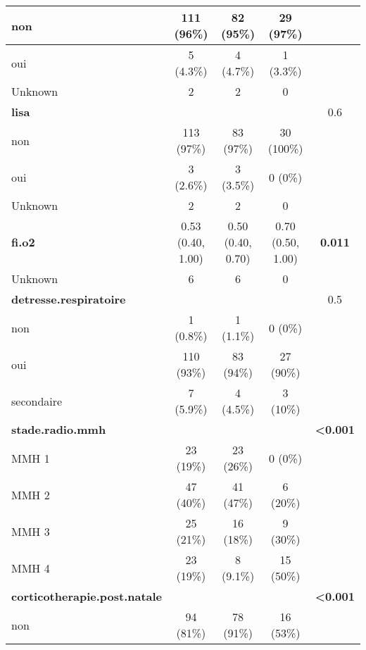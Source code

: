 \documentclass[
  10pt,
  a4paper,
]{scrartcl}
\begin{document}
\begin{table}
\begin{tabular}[t]{l|c|c|c|c}
\hline
\hspace{1em}non & 111 (96\%) & 82 (95\%) & 29 (97\%) & \\
\hline
\hspace{1em}oui & 5 (4.3\%) & 4 (4.7\%) & 1 (3.3\%) & \\
\hline
\hspace{1em}Unknown & 2 & 2 & 0 \vphantom{2} & \\
\hline
\textbf{lisa} &  &  &  & 0.6\\
\hline
\hspace{1em}non & 113 (97\%) & 83 (97\%) & 30 (100\%) & \\
\hline
\hspace{1em}oui & 3 (2.6\%) & 3 (3.5\%) & 0 (0\%) & \\
\hline
\hspace{1em}Unknown & 2 & 2 & 0 \vphantom{1} & \\
\hline
\textbf{fi.o2} & 0.53 (0.40, 1.00) & 0.50 (0.40, 0.70) & 0.70 (0.50, 1.00) & \textbf{0.011}\\
\hline
\hspace{1em}Unknown & 6 & 6 & 0 & \\
\hline
\textbf{detresse.respiratoire} &  &  &  & 0.5\\
\hline
\hspace{1em}non & 1 (0.8\%) & 1 (1.1\%) & 0 (0\%) & \\
\hline
\hspace{1em}oui & 110 (93\%) & 83 (94\%) & 27 (90\%) & \\
\hline
\hspace{1em}secondaire & 7 (5.9\%) & 4 (4.5\%) & 3 (10\%) & \\
\hline
\textbf{stade.radio.mmh} &  &  &  & \textbf{<0.001}\\
\hline
\hspace{1em}MMH 1 & 23 (19\%) & 23 (26\%) & 0 (0\%) & \\
\hline
\hspace{1em}MMH 2 & 47 (40\%) & 41 (47\%) & 6 (20\%) & \\
\hline
\hspace{1em}MMH 3 & 25 (21\%) & 16 (18\%) & 9 (30\%) & \\
\hline
\hspace{1em}MMH 4 & 23 (19\%) & 8 (9.1\%) & 15 (50\%) & \\
\hline
\textbf{corticotherapie.post.natale} &  &  &  & \textbf{<0.001}\\
\hline
\hspace{1em}non & 94 (81\%) & 78 (91\%) & 16 (53\%) & \\

\end{tabular}
\end{table}
\end{document}
